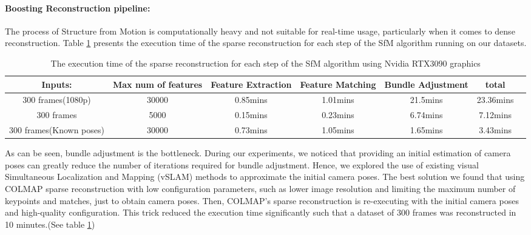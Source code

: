 \documentclass[11pt]{article}
\begin{document}
    \paragraph{Boosting Reconstruction pipeline:}
    The process of Structure from Motion is computationally heavy and not suitable for real-time usage,
    particularly when it comes to dense reconstruction. Table \ref{tab:exe_time} presents the execution time of the sparse reconstruction
    for each step of the SfM algorithm running on our datasets.
    \begin{table}[htb]
        \centering
        \begin{adjustbox}{max width=\textwidth}
            \begin{tabular}{|c|c|c|c|c|c|c|}
                \hline
                 Inputs:                 & Max num of features & Feature Extraction & Feature Matching & Bundle Adjustment & total    \\
                \hline
                300 frames(1080p)       & 30000               & 0.85mins           & 1.01mins          & 21.5mins          & 23.36mins \\
                \hline
                300 frames              & 5000                & 0.15mins           & 0.23mins          & 6.74mins          & 7.12mins \\
                \hline
                300 frames(Known poses) & 30000               & 0.73mins           & 1.05mins          & 1.65mins          & 3.43mins \\
                \hline
            \end{tabular}
        \end{adjustbox}
        \caption{The execution time of the sparse reconstruction for each step of the SfM algorithm using Nvidia RTX3090 graphics}
        \label{tab:exe_time}
    \end{table}

    As can be seen, bundle adjustment is the bottleneck. During our experiments, we noticed that providing an
    initial estimation of camera poses can greatly reduce the number of iterations required for bundle adjustment.
    Hence, we explored the use of existing visual Simultaneous Localization and Mapping (vSLAM) methods to approximate
    the initial camera poses. The best solution we found that using COLMAP sparse reconstruction with low configuration
    parameters, such as lower image resolution and limiting the maximum number of keypoints and matches, just to obtain
    camera poses. Then, COLMAP's sparse reconstruction is re-executing with the initial camera poses and high-quality configuration.
    This trick reduced the execution time significantly such that a dataset of 300 frames was reconstructed in 10 minutes.(See table \ref{tab:exe_time})
\end{document}
